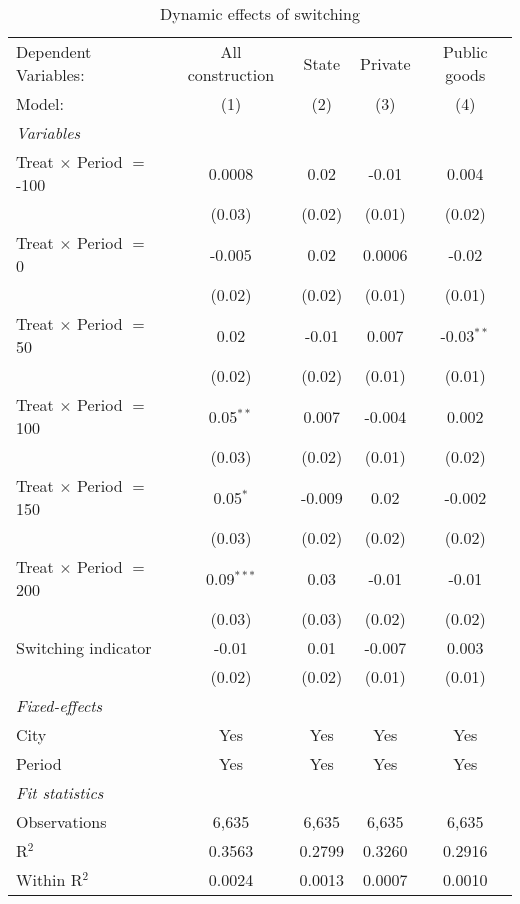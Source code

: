 \begin{table}[htbp]
   \caption{\label{tab:SW22_replication_50y} Dynamic effects of switching}
   \centering
   \begin{tabular}{lcccc}
      \tabularnewline \midrule \midrule
      Dependent Variables:            & All construction & State  & Private & Public goods\\  
      Model:                          & (1)              & (2)    & (3)     & (4)\\  
      \midrule
      \emph{Variables}\\
      Treat $\times$ Period $=$ -100  & 0.0008           & 0.02   & -0.01   & 0.004\\   
                                      & (0.03)           & (0.02) & (0.01)  & (0.02)\\   
      Treat $\times$ Period $=$ 0     & -0.005           & 0.02   & 0.0006  & -0.02\\   
                                      & (0.02)           & (0.02) & (0.01)  & (0.01)\\   
      Treat $\times$ Period $=$ 50    & 0.02             & -0.01  & 0.007   & -0.03$^{**}$\\   
                                      & (0.02)           & (0.02) & (0.01)  & (0.01)\\   
      Treat $\times$ Period $=$ 100   & 0.05$^{**}$      & 0.007  & -0.004  & 0.002\\   
                                      & (0.03)           & (0.02) & (0.01)  & (0.02)\\   
      Treat $\times$ Period $=$ 150   & 0.05$^{*}$       & -0.009 & 0.02    & -0.002\\   
                                      & (0.03)           & (0.02) & (0.02)  & (0.02)\\   
      Treat $\times$ Period $=$ 200   & 0.09$^{***}$     & 0.03   & -0.01   & -0.01\\   
                                      & (0.03)           & (0.03) & (0.02)  & (0.02)\\   
      Switching indicator             & -0.01            & 0.01   & -0.007  & 0.003\\   
                                      & (0.02)           & (0.02) & (0.01)  & (0.01)\\   
      \midrule
      \emph{Fixed-effects}\\
      City                            & Yes              & Yes    & Yes     & Yes\\  
      Period                          & Yes              & Yes    & Yes     & Yes\\  
      \midrule
      \emph{Fit statistics}\\
      Observations                    & 6,635            & 6,635  & 6,635   & 6,635\\  
      R$^2$                           & 0.3563           & 0.2799 & 0.3260  & 0.2916\\  
      Within R$^2$                    & 0.0024           & 0.0013 & 0.0007  & 0.0010\\  
      \midrule \midrule
      

\end{tabular}
\end{table}
